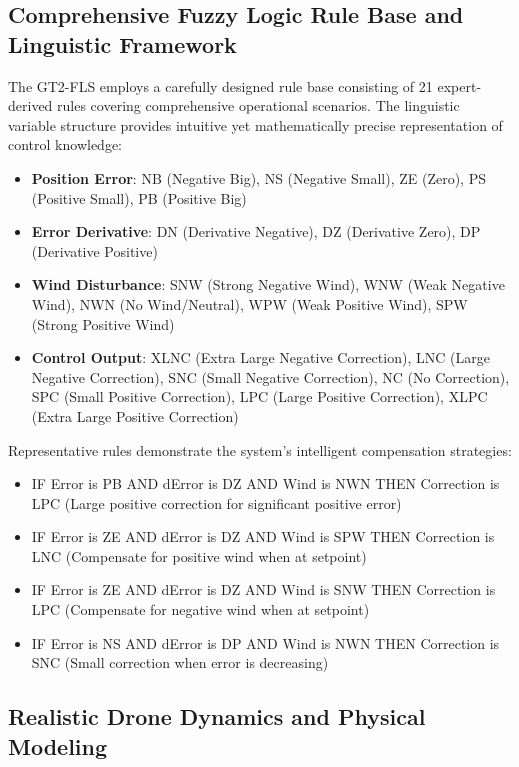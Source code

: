 \subsection*{Comprehensive Fuzzy Logic Rule Base and Linguistic Framework}

The GT2-FLS employs a carefully designed rule base consisting of 21 expert-derived rules covering comprehensive operational scenarios. The linguistic variable structure provides intuitive yet mathematically precise representation of control knowledge:

\begin{itemize}
    \item \textbf{Position Error}: NB (Negative Big), NS (Negative Small), ZE (Zero), PS (Positive Small), PB (Positive Big)
    \item \textbf{Error Derivative}: DN (Derivative Negative), DZ (Derivative Zero), DP (Derivative Positive)
    \item \textbf{Wind Disturbance}: SNW (Strong Negative Wind), WNW (Weak Negative Wind), NWN (No Wind/Neutral), WPW (Weak Positive Wind), SPW (Strong Positive Wind)
    \item \textbf{Control Output}: XLNC (Extra Large Negative Correction), LNC (Large Negative Correction), SNC (Small Negative Correction), NC (No Correction), SPC (Small Positive Correction), LPC (Large Positive Correction), XLPC (Extra Large Positive Correction)
\end{itemize}

Representative rules demonstrate the system's intelligent compensation strategies:
\begin{itemize}
    \item IF Error is PB AND dError is DZ AND Wind is NWN THEN Correction is LPC (Large positive correction for significant positive error)
    \item IF Error is ZE AND dError is DZ AND Wind is SPW THEN Correction is LNC (Compensate for positive wind when at setpoint)
    \item IF Error is ZE AND dError is DZ AND Wind is SNW THEN Correction is LPC (Compensate for negative wind when at setpoint)
    \item IF Error is NS AND dError is DP AND Wind is NWN THEN Correction is SNC (Small correction when error is decreasing)
\end{itemize}

\subsection*{Realistic Drone Dynamics and Physical Modeling}

